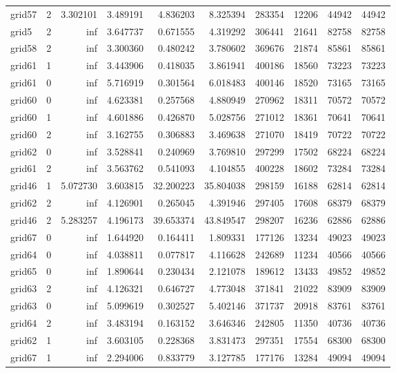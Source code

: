 \begin{longtable}{|l|r|r|r|r|r|r|r|r|r|}
grid57 & 2 & 3.302101 & 3.489191 & 4.836203 & 8.325394 & 283354 & 12206 & 44942 & 44942 \\
grid5 & 2 & inf & 3.647737 & 0.671555 & 4.319292 & 306441 & 21641 & 82758 & 82758 \\
grid58 & 2 & inf & 3.300360 & 0.480242 & 3.780602 & 369676 & 21874 & 85861 & 85861 \\
grid61 & 1 & inf & 3.443906 & 0.418035 & 3.861941 & 400186 & 18560 & 73223 & 73223 \\
grid61 & 0 & inf & 5.716919 & 0.301564 & 6.018483 & 400146 & 18520 & 73165 & 73165 \\
grid60 & 0 & inf & 4.623381 & 0.257568 & 4.880949 & 270962 & 18311 & 70572 & 70572 \\
grid60 & 1 & inf & 4.601886 & 0.426870 & 5.028756 & 271012 & 18361 & 70641 & 70641 \\
grid60 & 2 & inf & 3.162755 & 0.306883 & 3.469638 & 271070 & 18419 & 70722 & 70722 \\
grid62 & 0 & inf & 3.528841 & 0.240969 & 3.769810 & 297299 & 17502 & 68224 & 68224 \\
grid61 & 2 & inf & 3.563762 & 0.541093 & 4.104855 & 400228 & 18602 & 73284 & 73284 \\
grid46 & 1 & 5.072730 & 3.603815 & 32.200223 & 35.804038 & 298159 & 16188 & 62814 & 62814 \\
grid62 & 2 & inf & 4.126901 & 0.265045 & 4.391946 & 297405 & 17608 & 68379 & 68379 \\
grid46 & 2 & 5.283257 & 4.196173 & 39.653374 & 43.849547 & 298207 & 16236 & 62886 & 62886 \\
grid67 & 0 & inf & 1.644920 & 0.164411 & 1.809331 & 177126 & 13234 & 49023 & 49023 \\
grid64 & 0 & inf & 4.038811 & 0.077817 & 4.116628 & 242689 & 11234 & 40566 & 40566 \\
grid65 & 0 & inf & 1.890644 & 0.230434 & 2.121078 & 189612 & 13433 & 49852 & 49852 \\
grid63 & 2 & inf & 4.126321 & 0.646727 & 4.773048 & 371841 & 21022 & 83909 & 83909 \\
grid63 & 0 & inf & 5.099619 & 0.302527 & 5.402146 & 371737 & 20918 & 83761 & 83761 \\
grid64 & 2 & inf & 3.483194 & 0.163152 & 3.646346 & 242805 & 11350 & 40736 & 40736 \\
grid62 & 1 & inf & 3.603105 & 0.228368 & 3.831473 & 297351 & 17554 & 68300 & 68300 \\
grid67 & 1 & inf & 2.294006 & 0.833779 & 3.127785 & 177176 & 13284 & 49094 & 49094 \\

\end{longtable}
